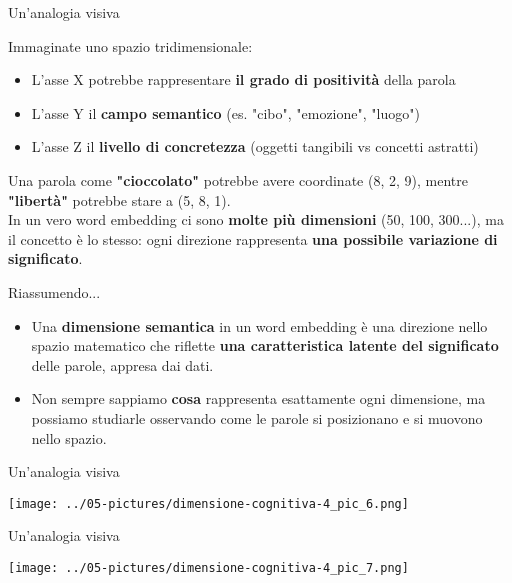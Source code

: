 \documentclass[aspectratio=169]{beamer}
\begin{document}
%
\begin{frame}{Un'analogia visiva}

Immaginate uno spazio tridimensionale:
\begin{itemize}
\item L’asse X potrebbe rappresentare \textbf{il grado di positività} della parola
\item L’asse Y il \textbf{campo semantico} (es. "cibo", "emozione", "luogo")
\item L’asse Z il \textbf{livello di concretezza} (oggetti tangibili vs concetti astratti)
\end{itemize}
\vspace{.3cm}
Una parola come \textbf{"cioccolato"} potrebbe avere coordinate (8, 2, 9), mentre \textbf{"libertà"} potrebbe stare a (5, 8, 1).\\
\vspace{0.3cm}
In un vero word embedding ci sono \textbf{molte più dimensioni} (50, 100, 300...), ma il concetto è lo stesso: ogni direzione rappresenta \textbf{una possibile variazione di significato}.

\end{frame}
%
%
\begin{frame}{Riassumendo...}
\begin{itemize}
\item Una \textbf{dimensione semantica} in un word embedding è una direzione nello spazio matematico che riflette \textbf{una caratteristica latente del significato} delle parole, appresa dai dati.
\item Non sempre sappiamo \textbf{cosa} rappresenta esattamente ogni dimensione, ma possiamo studiarle osservando come le parole si posizionano e si muovono nello spazio.
\end{itemize}
\end{frame}
%
%
\begin{frame}{Un'analogia visiva}
\begin{center}
\texttt{[image: ../05-pictures/dimensione-cognitiva-4\_pic\_6.png]} 
\end{center}
\end{frame}
%
%
\begin{frame}{Un'analogia visiva}
\begin{center}
\texttt{[image: ../05-pictures/dimensione-cognitiva-4\_pic\_7.png]} 
\end{center}
\end{frame}
\end{document}
